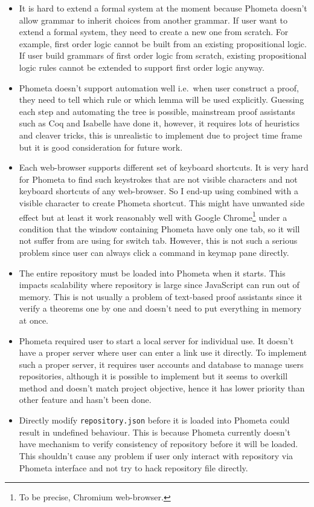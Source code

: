 \documentclass[master.tex]{subfiles}
\begin{document}
\begin{itemize}
\item It is hard to extend a formal system at the moment because Phometa doesn't
  allow grammar to inherit choices from another grammar. If user want to extend
  a formal system, they need to create a new one from scratch. For example,
  first order logic cannot be built from an existing propositional logic. If
  user build grammars of first order logic from scratch, existing propositional
  logic rules cannot be extended to support first order logic anyway.
\item Phometa doesn't support automation well i.e.\ when user construct a proof,
  they need to tell which rule or which lemma will be used explicitly. Guessing
  each step and automating the tree is possible, mainstream proof assistants
  such as Coq and Isabelle have done it, however, it requires lots of heuristics
  and cleaver tricks, this is unrealistic to implement due to project time
  frame but it is good consideration for future work.
\item Each web-browser supports different set of keyboard shortcuts. It is very
  hard for Phometa to find such keystrokes that are not visible characters and
  not keyboard shortcuts of any web-browser. So I end-up using 
  combined with a visible character to create Phometa shortcut. This might have
  unwanted side effect but at least it work reasonably well with Google
  Chrome\footnote{To be precise, Chromium web-browser.} under a condition that
  the window containing Phometa have only one tab, so it will not suffer from
   are using for switch tab. However, this is not such a
  serious problem since user can always click a command in keymap pane directly.
\item The entire repository must be loaded into Phometa when it starts. This
  impacts scalability where repository is large since JavaScript can run out of
  memory. This is not usually a problem of text-based proof assistants since it
  verify a theorems one by one and doesn't need to put everything in memory at
  once.
\item Phometa required user to start a local server for individual use. It
  doesn't have a proper server where user can enter a link use it directly. To
  implement such a proper server, it requires user accounts and database to
  manage users repositories, although it is possible to implement but it seems
  to overkill method and doesn't match project objective, hence it has lower
  priority than other feature and hasn't been done.
\item Directly modify \texttt{repository.json} before it is loaded into Phometa
  could result in undefined behaviour. This is because Phometa currently doesn't
  have mechanism to verify consistency of repository before it will be loaded.
  This shouldn't cause any problem if user only interact with repository via
  Phometa interface and not try to hack repository file directly.
\end{itemize}
\end{document}
